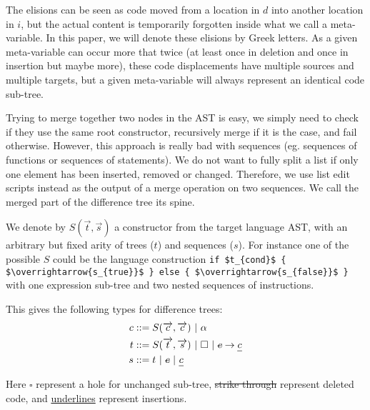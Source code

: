 \documentclass[a4paper,10pt]{article}
\newcommand{\typsep}{\ |\ }
\begin{document}
The elisions can be seen as code moved from a location in $d$ into another location in $i$, but the actual content is temporarily forgotten inside what we call a meta-variable. In this paper, we will denote these elisions by Greek letters. As a given meta-variable can occur more that twice (at least once in deletion and once in insertion but maybe more), these code displacements have multiple sources and multiple targets, but a given meta-variable will always represent an identical code sub-tree.

Trying to merge together two nodes in the AST is easy, we simply need to check if they use the same root constructor, recursively merge if it is the case, and fail otherwise. However, this approach is really bad with sequences (eg. sequences of functions or sequences of statements). We do not want to fully split a list if only one element has been inserted, removed or changed. Therefore, we use list edit scripts instead as the output of a merge operation on two sequences. We call the merged part of the difference tree its spine.

We denote by $S(\overrightarrow{t}, \overrightarrow{s})$ a constructor from the target language AST, with an arbitrary but fixed arity of trees ($t$) and sequences ($s$). For instance one of the possible $S$ could be the language construction \lstinline[mathescape]|if $t_{cond}$ { $\overrightarrow{s_{true}}$ } else { $\overrightarrow{s_{false}}$ }| with one expression sub-tree and two nested sequences of instructions.

This gives the following types for difference trees:
\begin{align*}
c &::= S(\overrightarrow{c}, \overrightarrow{c}) \typsep \alpha\\
t &::= S(\overrightarrow{t}, \overrightarrow{s}) \typsep \square \typsep \text{\st{$c$}} \rightarrow \text{\ul{$c$}}\\
s &::= t \typsep \text{\st{$c$}} \typsep \text{\ul{$c$}}\\
\end{align*}

Here $\square$ represent a hole for unchanged sub-tree, \st{strike through} represent deleted code, and \ul{underlines} represent insertions.
\end{document}
